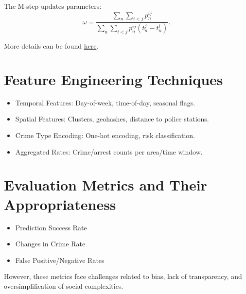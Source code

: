 \documentclass{article}
\begin{document}
The M-step updates parameters:
\begin{equation}
    \omega = \frac{\sum_n \sum_{i < j} p_n^{ij}}{\sum_n \sum_{i < j} p_n^{ij} (t_n^j - t_n^i)}.
\end{equation}

More details can be found \href{https://github.com/arun-ramamurthy/pred-pol/blob/master/doc/Rederivation\%20of\%20Mohler\%20et\%20al.pdf}{here}.

\section{Feature Engineering Techniques}
\begin{itemize}
    \item Temporal Features: Day-of-week, time-of-day, seasonal flags.
    \item Spatial Features: Clusters, geohashes, distance to police stations.
    \item Crime Type Encoding: One-hot encoding, risk classification.
    \item Aggregated Rates: Crime/arrest counts per area/time window.
\end{itemize}

\section{Evaluation Metrics and Their Appropriateness}
\begin{itemize}
    \item Prediction Success Rate
    \item Changes in Crime Rate
    \item False Positive/Negative Rates
\end{itemize}

However, these metrics face challenges related to bias, lack of transparency, and oversimplification of social complexities.
\end{document}
